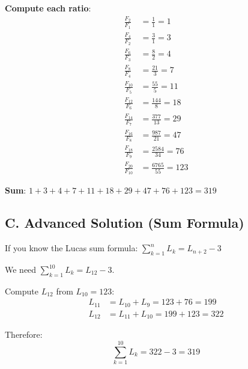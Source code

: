 \documentclass[12pt]{article}
\begin{document}
\begin{solutionbox}
\textbf{Compute each ratio}:
\begin{align*}
    \frac{F_2}{F_1} &= \frac{1}{1} = 1 \\
    \frac{F_4}{F_2} &= \frac{3}{1} = 3 \\
    \frac{F_6}{F_3} &= \frac{8}{2} = 4 \\
    \frac{F_8}{F_4} &= \frac{21}{3} = 7 \\
    \frac{F_{10}}{F_5} &= \frac{55}{5} = 11 \\
    \frac{F_{12}}{F_6} &= \frac{144}{8} = 18 \\
    \frac{F_{14}}{F_7} &= \frac{377}{13} = 29 \\
    \frac{F_{16}}{F_8} &= \frac{987}{21} = 47 \\
    \frac{F_{18}}{F_9} &= \frac{2584}{34} = 76 \\
    \frac{F_{20}}{F_{10}} &= \frac{6765}{55} = 123
\end{align*}

\textbf{Sum}: $1 + 3 + 4 + 7 + 11 + 18 + 29 + 47 + 76 + 123 = 319$

\subsection*{C. Advanced Solution (Sum Formula)}

If you know the Lucas sum formula: $\sum_{k=1}^{n} L_k = L_{n+2} - 3$

We need $\sum_{k=1}^{10} L_k = L_{12} - 3$.

Compute $L_{12}$ from $L_{10} = 123$:
\begin{align*}
    L_{11} &= L_{10} + L_9 = 123 + 76 = 199 \\
    L_{12} &= L_{11} + L_{10} = 199 + 123 = 322
\end{align*}

Therefore:
$$\sum_{k=1}^{10} L_k = 322 - 3 = 319$$

\end{solutionbox}
\end{document}
